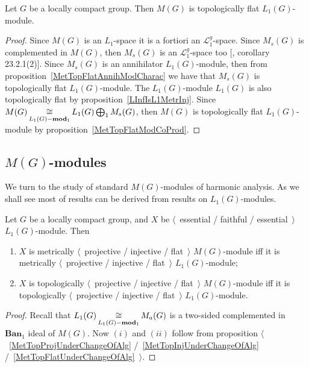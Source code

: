 \begin{proposition}\label{MeasAlgIsL1TopFlat} Let $G$ be a locally compact
group. Then $M(G)$ is topologically flat $L_1(G)$-module.
\end{proposition}
\begin{proof} Since $M(G)$ is an $L_1$-space it is a fortiori an
$\mathscr{L}_1^g$-space. Since $M_s(G)$ is complemented in $M(G)$, then $M_s(G)$
is an $\mathscr{L}_1^g$-space too [\cite{DefFloTensNorOpId}, corollary
23.2.1(2)]. Since $M_s(G)$ is an annihilator $L_1(G)$-module, then from
proposition~\ref{MetTopFlatAnnihModCharac} we have that $M_s(G)$ is
topologically flat $L_1(G)$-module. The $L_1(G)$-module $L_1(G)$ is also
topologically flat by proposition~\ref{LInfIsL1MetrInj}. Since
$M(G)\mathop{\mathbin{\cong}}\limits_{L_1(G)-\mathbf{mod}_1}L_1(G)\bigoplus_1 M_s(G)$, then $M(G)$ is
topologically flat $L_1(G)$-module by proposition~\ref{MetTopFlatModCoProd}.
\end{proof}


\subsection{\texorpdfstring{$M(G)$}{M (G)}-modules}\label{SubSectionMGModules}

We turn to the study of standard $M(G)$-modules of harmonic analysis. As we
shall see most of results can be derived from results on $L_1(G)$-modules.

\begin{proposition}\label{MGMetTopProjInjFlatRedToL1} Let $G$ be a locally
compact group, and $X$ be $\langle$~essential / faithful / essential~$\rangle$
$L_1(G)$-module. Then

\begin{enumerate}[label = (\roman*)]
    \item $X$ is metrically $\langle$~projective / injective / flat~$\rangle$
    $M(G)$-module iff it is metrically $\langle$~projective / injective /
    flat~$\rangle$ $L_1(G)$-module;

    \item $X$ is topologically $\langle$~projective / injective / flat~$\rangle$
    $M(G)$-module iff it is topologically $\langle$~projective / injective /
    flat~$\rangle$ $L_1(G)$-module.
\end{enumerate}
\end{proposition}
\begin{proof} Recall that $L_1(G)\mathop{\mathbin{\cong}}\limits_{L_1(G)-\mathbf{mod}_1}M_a(G)$ is a
two-sided complemented in $\mathbf{Ban}_1$ ideal of $M(G)$. Now $(i)$ and $(ii)$
follow from proposition $\langle$~\ref{MetTopProjUnderChangeOfAlg}
/~\ref{MetTopInjUnderChangeOfAlg}  /~\ref{MetTopFlatUnderChangeOfAlg}~$\rangle$.
\end{proof} 

